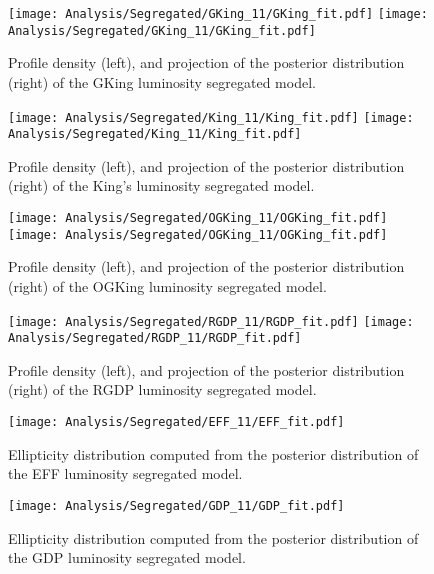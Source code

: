 \begin {figure}
 \centering
 \texttt{[image: Analysis/Segregated/GKing\_11/GKing\_fit.pdf]}
 \texttt{[image: Analysis/Segregated/GKing\_11/GKing\_fit.pdf]}
  \caption{Profile density (left), and projection of the posterior distribution (right) of the GKing luminosity segregated model.}
\label{fig:GKingSeg}
\end {figure}

\begin {figure}
 \centering
 \texttt{[image: Analysis/Segregated/King\_11/King\_fit.pdf]}
 \texttt{[image: Analysis/Segregated/King\_11/King\_fit.pdf]}
  \caption{Profile density (left), and projection of the posterior distribution (right) of the King's luminosity segregated model.}
\label{fig:KingSeg}
\end {figure}

\begin {figure}
 \centering
 \texttt{[image: Analysis/Segregated/OGKing\_11/OGKing\_fit.pdf]}
 \texttt{[image: Analysis/Segregated/OGKing\_11/OGKing\_fit.pdf]}
  \caption{Profile density (left), and projection of the posterior distribution (right) of the OGKing luminosity segregated model.}
\label{fig:OGKingSeg}
\end {figure}

\begin {figure}
 \centering
 \texttt{[image: Analysis/Segregated/RGDP\_11/RGDP\_fit.pdf]}
 \texttt{[image: Analysis/Segregated/RGDP\_11/RGDP\_fit.pdf]}
  \caption{Profile density (left), and projection of the posterior distribution (right) of the RGDP luminosity segregated model.}
\label{fig:RGDPSeg}
\end {figure}


\clearpage
\begin{figure}
 \centering
 \texttt{[image: Analysis/Segregated/EFF\_11/EFF\_fit.pdf]}
  \caption{Ellipticity distribution computed from the posterior distribution of the EFF luminosity segregated model.}
\label{fig:EFFSegEpsilon}
\end {figure}

\begin {figure}
 \centering
 \texttt{[image: Analysis/Segregated/GDP\_11/GDP\_fit.pdf]}
  \caption{Ellipticity distribution computed from the posterior distribution of the GDP luminosity segregated model.}
\label{fig:GDPSegEpsilon}
\end {figure}

